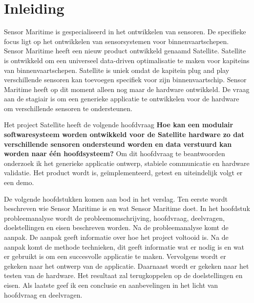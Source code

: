 \chapter{Inleiding}
Sensor Maritime is gespecialiseerd in het ontwikkelen van sensoren. De specifieke focus ligt op het ontwikkelen van sensorsystemen voor binnenvaartschepen. Sensor Maritime heeft een nieuw product ontwikkeld genaamd Satellite. Satellite is ontwikkeld om een universeel data-driven optimalisatie te maken voor kapiteins van binnenvaartschepen. Satellite is uniek omdat de kapitein plug and play verschillende sensoren kan toevoegen specifiek voor zijn binnenvaartschip. Sensor Maritime heeft op dit moment alleen nog maar de hardware ontwikkeld. De vraag aan de stagiair is om een generieke applicatie te ontwikkelen voor de hardware om verschillende sensoren te ondersteunen.\newline

\noindent Het project Satellite heeft de volgende hoofdvraag \textbf{Hoe kan een modulair softwaresysteem worden ontwikkeld voor de Satellite hardware zo dat verschillende sensoren ondersteund worden en data verstuurd kan worden naar één hoofdsysteem?} Om dit hoofdvraag te beantwoorden onderzoek ik het generieke applicatie ontwerp, stabiele communicatie en hardware validatie. Het product wordt is, geïmplementeerd, getest en uiteindelijk volgt er een demo. \newline


\noindent De volgende hoofdstukken komen aan bod in het verslag. Ten eerste wordt beschreven wie Sensor Maritime is en wat Sensor Maritime doet. In het hoofdstuk probleemanalyse wordt de probleemomschrijving, hoofdvraag, deelvragen, doelstellingen en eisen beschreven worden. Na de probleemanalyse komt de aanpak. De aanpak geeft informatie over hoe het project voltooid is. Na de aanpak komt de methode technieken, dit geeft informatie wat er nodig is en wat er gebruikt is om een succesvolle applicatie te maken. Vervolgens wordt er gekeken naar het ontwerp van de applicatie. Daarnaast wordt er gekeken naar het testen van de hardware. Het resultaat zal terugkoppelen op de doelstellingen en eisen. Als laatste geef ik een conclusie en aanbevelingen in het licht van hoofdvraag en deelvragen.